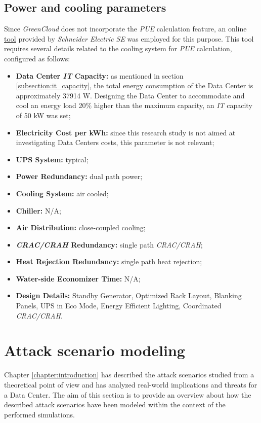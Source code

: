 \subsection{Power and cooling parameters} \label{subsection:powercooling}
Since \emph{GreenCloud} does not incorporate the \emph{PUE} calculation feature, an online \href{https://www.se.com/ww/en/work/solutions/system/s1/data-center-and-network-systems/trade-off-tools/data-center-efficiency-and-pue-calculator/}{tool} provided by \emph{Schneider Electric SE} was employed for this purpose. This tool requires several details related to the cooling system for \emph{PUE} calculation, configured as follows:
\begin{itemize}
    \item \textbf{Data Center \emph{IT} Capacity:} as mentioned in section \ref{subsection:it_capacity}, the total energy consumption of the Data Center is approximately 37914 W. Designing the Data Center to accommodate and cool an energy load 20\% higher than the maximum capacity, an \emph{IT} capacity of 50 kW was set;
    \item \textbf{Electricity Cost per kWh:} since this research study is not aimed at investigating Data Centers costs, this parameter is not relevant;
    \item \textbf{UPS System:} typical;
    \item \textbf{Power Redundancy:} dual path power;
    \item \textbf{Cooling System:} air cooled;
    \item \textbf{Chiller:} N/A;
    \item \textbf{Air Distribution:} close-coupled cooling;
    \item \textbf{\emph{CRAC/CRAH} Redundancy:} single path \emph{CRAC/CRAH};
    \item \textbf{Heat Rejection Redundancy:} single path heat rejection;
    \item \textbf{Water-side Economizer Time:} N/A;
    \item \textbf{Design Details:} Standby Generator, Optimized Rack Layout, Blanking Panels, UPS in Eco Mode, Energy Efficient Lighting, Coordinated \emph{CRAC/CRAH}.
\end{itemize}

\section{Attack scenario modeling}
Chapter \ref{chapter:introduction} has described the attack scenarios studied from a theoretical point of view and has analyzed real-world implications and threats for a Data Center. The aim of this section is to provide an overview about how the described attack scenarios have been modeled within the context of the performed simulations.


